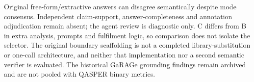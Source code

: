 Original free-form/extractive answers can disagree semantically despite mode consensus. Independent claim-support, answer-completeness and annotation adjudication remain absent; the agent review is diagnostic only. C differs from B in extra analysis, prompts and fulfilment logic, so comparison does not isolate the selector. The original boundary scaffolding is not a completed library-substitution or one-call architecture, and neither that implementation nor a second semantic verifier is evaluated. The historical GaRAGe grounding findings remain archived and are not pooled with QASPER binary metrics.
